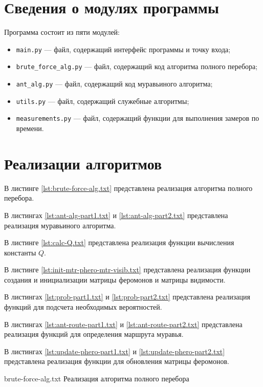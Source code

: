\section{Сведения о модулях программы}

Программа состоит из пяти модулей: 

\begin{itemize}[label*=--]
	\item \texttt{main.py} --- файл, содержащий интерфейс программы и точку входа;
	\item \texttt{brute\_force\_alg.py} --- файл, содержащий код алгоритма полного перебора;
	\item \texttt{ant\_alg.py} --- файл, содержащий код муравьиного алгоритма;
	\item \texttt{utils.py} --- файл, содержащий служебные алгоритмы;
	\item \texttt{measurements.py} --- файл, содержащий функции для выполнения замеров по времени.
\end{itemize}

\section{Реализации алгоритмов}

В листинге \ref{lst:brute-force-alg.txt} представлена реализация алгоритма полного перебора.

В листингах \ref{lst:ant-alg-part1.txt} и \ref{lst:ant-alg-part2.txt} представлена реализация муравьиного алгоритма.

В листинге \ref{lst:calc-Q.txt} представлена реализация функции вычисления константы $Q$.

В листинге \ref{lst:init-mtr-phero-mtr-visib.txt} представлена реализация функции создания и инициализации матрицы феромонов и матрицы видимости.

В листингах \ref{lst:prob-part1.txt} и \ref{lst:prob-part2.txt} представлена реализация функций для подсчета необходимых вероятностей.

В листингах \ref{lst:ant-route-part1.txt} и \ref{lst:ant-route-part2.txt} представлена реализация функций для определения маршрута муравья.

В листингах \ref{lst:update-phero-part1.txt} и \ref{lst:update-phero-part2.txt} представлена реализация функции для обновления матрицы феромонов.

\clearpage

{brute-force-alg.txt} %
{Реализация алгоритма полного перебора} %

